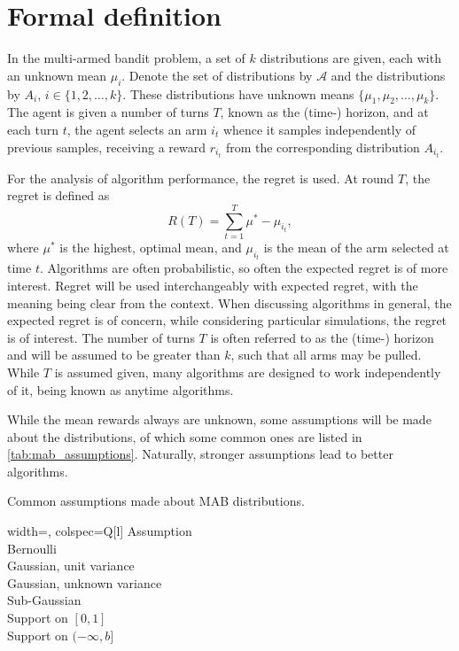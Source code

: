 \section{Formal definition}
In the multi-armed bandit problem, a set of $k$ distributions are given, each with an unknown mean $\mu_i$.
Denote the set of distributions by $\mathcal{A}$ and the distributions by $A_i$, $i \in \{1,2,\dots,k\}$.
These distributions have unknown means $\{\mu_1, \mu_2,\dots,\mu_k\}$.
The agent is given a number of turns $T$, known as the (time-) horizon, and at each turn $t$, the agent selects an arm $i_t$ whence it samples independently of previous samples, receiving a reward $r_{i_t}$ from the corresponding distribution $A_{i_t}$.

For the analysis of algorithm performance, the regret is used.
At round $T$, the regret is defined as
\begin{equation}
    R(T) = \sum_{t=1}^T \mu^* - \mu_{i_t},
\end{equation}
where $\mu^*$ is the highest, optimal mean, and $\mu_{i_t}$ is the mean of the arm selected at time $t$.
Algorithms are often probabilistic, so often the expected regret is of more interest.
Regret will be used interchangeably with expected regret, with the meaning being clear from the context.
When discussing algorithms in general, the expected regret is of concern, while considering particular simulations, the regret is of interest.
The number of turns $T$ is often referred to as the (time-) horizon and will be assumed to be greater than $k$, such that all arms may be pulled.
While $T$ is assumed given, many algorithms are designed to work independently of it, being known as anytime algorithms.

While the mean rewards always are unknown, some assumptions will be made about the distributions, of which some common ones are listed in \cref{tab:mab_assumptions}.
Naturally, stronger assumptions lead to better algorithms.

\begin{table}
    \centering
    \caption{
        Common assumptions made about MAB distributions.
    }
    \label{tab:mab_assumptions}
    \begin{tblr}{
            width=\linewidth,
            colspec={Q[l]}
        }
        \toprule
        Assumption                 \\
        \midrule
        Bernoulli                  \\
        Gaussian, unit variance    \\
        Gaussian, unknown variance \\
        Sub-Gaussian               \\
        Support on $[0,1]$         \\
        Support on $(-\infty,b]$   \\
        \bottomrule
    \end{tblr}
\end{table}



